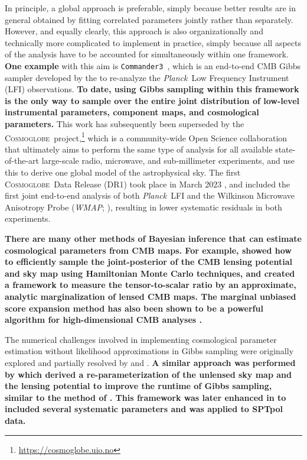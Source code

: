 \documentclass[twocolumn]{aa}
\def\WMAP{\emph{WMAP}}
\def\Planck{\emph{Planck}}
\def\commanderthree{\texttt{Commander3}}
\newcommand{\cosmoglobe}{\textsc{Cosmoglobe}}
\begin{document}
In principle, a global approach is preferable, simply because better results are in general obtained by fitting correlated parameters jointly rather than separately. However, and equally clearly, this approach is also organizationally and technically more complicated to implement in practice, simply because all aspects of the analysis have to be accounted for simultaneously within one framework. \textbf{One example} with this aim is \commanderthree\ \citep{bp03}, which is an end-to-end CMB Gibbs sampler developed by the \citet{bp01} to re-analyze the \Planck\ Low Frequency Instrument (LFI) observations. \textbf{To date, using Gibbs sampling within this framework is the only way to sample over the entire joint distribution of low-level instrumental parameters, component maps, and cosmological parameters.} This work has subsequently been superseded by the \cosmoglobe\ project,\footnote{\url{https://cosmoglobe.uio.no}} which is a community-wide Open Science collaboration that ultimately aims to perform the same type of analysis for all available state-of-the-art large-scale radio, microwave, and sub-millimeter experiments, and use this to derive one global model of the astrophysical sky. The first \cosmoglobe\ Data Release (DR1) took place in March 2023 \citep{watts2023_dr1}, and included the first joint end-to-end analysis of both \Planck\ LFI and the Wilkinson Microwave Anisotropy Probe (\WMAP; \citealp{bennett2012}), resulting in lower systematic residuals in both experiments.

\textbf{There are many other methods of Bayesian inference that can estimate cosmological parameters from CMB maps. For example, \citet{Anderes:2014foa} showed how to efficiently sample the joint-posterior of the CMB lensing potential and sky map using Hamiltonian Monte Carlo techniques, and \citet{Carron:2018lcr} created a framework to measure the tensor-to-scalar ratio by an approximate, analytic marginalization of lensed CMB maps. The marginal unbiased score expansion method has also been shown to be a powerful algorithm for high-dimensional CMB analyses \citep{Millea:2021had}.
}

The numerical challenges involved in implementing cosmological parameter estimation without likelihood approximations in Gibbs sampling were originally explored and partially resolved by \citet{jewell:2009} and \citet{racine:2016}. \textbf{A similar approach was performed by \citet{Millea:2020cpw} which derived a re-parameterization of the unlensed sky map and the lensing potential to improve the runtime of Gibbs sampling, similar to the method of \citet{racine:2016}. This framework was later enhanced in \citet{Millea:2020iuw} to included several systematic parameters and was applied to SPTpol data.}
\end{document}
